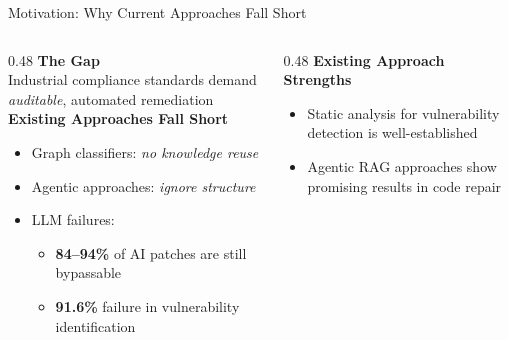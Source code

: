 \documentclass[aspectratio=169,10pt]{beamer}
\begin{document}
\begin{frame}{Motivation: Why Current Approaches Fall Short}

\begin{columns}[T]
  \begin{column}{0.48\textwidth}
    \textbf{The Gap}\\[0.4em]
    Industrial compliance standards demand \emph{auditable}, automated remediation \cite{iso27001}\\[0.8em]

    \textbf{Existing Approaches Fall Short}
    \begin{itemize}
      \item Graph classifiers: \emph{no knowledge reuse}
      \item Agentic approaches: \emph{ignore structure}
      \item LLM failures:
      \begin{itemize}
        \item \textbf{84--94\%} of AI patches are still bypassable \cite{mahmud2025systematic}
        \item \textbf{91.6\%} failure in vulnerability identification \cite{McClanahan2024Meets}
      \end{itemize}
    \end{itemize}
    
    \begin{center}
    \end{center}
  \end{column}

  \begin{column}{0.48\textwidth}
    \textbf{Existing Approach Strengths}
    \begin{itemize}
      \item Static analysis for vulnerability detection is well-established \cite{joern}
      \item Agentic RAG approaches show promising results in code repair \cite{Seo2025AutoPatchMF, bouzenia2025repairagent}
    \end{itemize}


\end{column}
\end{columns}
\end{frame}
\end{document}
